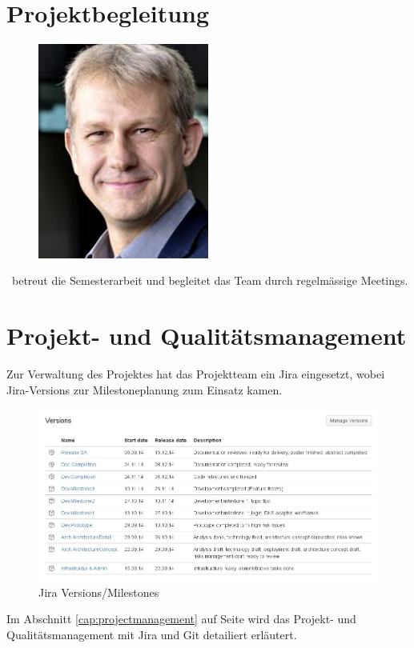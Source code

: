 	\section{Projektbegleitung}
	\begin{figure}[H]
		\begin{minipage}[b]{0.5\linewidth}
			\includegraphics[width=0.5\textwidth]{projectPlan/media/img/ozimmermann.jpg}
			\centering
			\caption{\teacher}
			\label{fig:olafzimmermann}
		\end{minipage}
	\end{figure}
	\teacher\ betreut die Semesterarbeit und begleitet das Team durch regelmässige Meetings.


	\section{Projekt- und Qualitätsmanagement}
		Zur Verwaltung des Projektes hat das Projektteam ein Jira eingesetzt,
		wobei Jira-Versions zur Milestoneplanung zum Einsatz kamen.
		
		\begin{figure}[H]
			\includegraphics[width=\textwidth]{projectPlan/media/img/jiraVersions.jpg}
			\centering
			\caption{Jira Versions/Milestones}
			\label{fig:jiraVersions}
		\end{figure}
		
		Im Abschnitt \ref{cap:projectmanagement} auf Seite \pageref{cap:projectmanagement} wird das Projekt- und Qualitätsmanagement mit Jira und Git detailiert erläutert.
	
